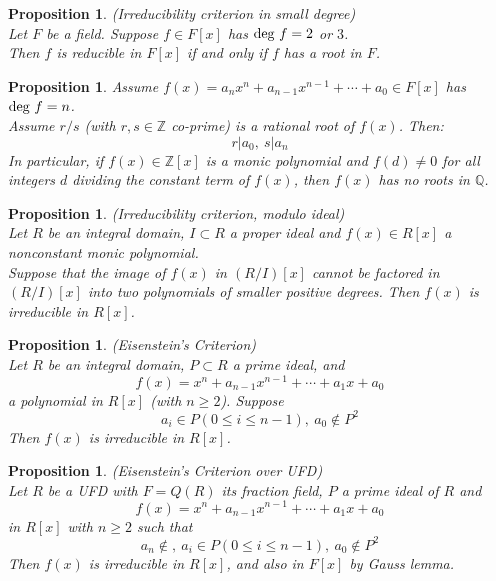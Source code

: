 \documentclass[a4paper,8pt]{article}
\newcommand{\Q}{\mathbb{Q}}
\newcommand{\Z}{\mathbb{Z}}
\newcommand{\hlt}[1]{\textit{{\color{blue}#1}}}
\newcommand{\degs}[1]{\textnormal{deg}#1}
\theoremstyle{theorem}
\newtheorem{proposition}[theorem]{Proposition}
\begin{document}
\begin{proposition}
\hlt{(Irreducibility criterion in small degree)}\\
Let $F$ be a field. Suppose $f \in F[x]$	 has $\degs \ f = 2$ or $3$. \\
Then $f$ is reducible in $F[x]$ if and only if $f$ has a root in $F$.
\end{proposition}

\begin{proposition}
Assume $f(x) = a_n x^n + a_{n-1} x^{n-1} + \cdots + a_0 \in F[x]$ has $\degs \ f = n$.\\
Assume $r/s$ (with $r, s \in \Z$ co-prime) is a rational root of $f(x)$. Then:
\begin{equation}
r|a_0,\ s|a_n \nonumber
\end{equation}	
In particular, if $f(x) \in \Z[x]$ is a monic polynomial and $f(d) \neq 0$ for all integers $d$ dividing the constant term of $f(x)$, then $f(x)$ has no roots in $\Q$.
\end{proposition}

\begin{proposition}
\hlt{(Irreducibility criterion, modulo ideal)}\\
Let $R$ be an integral domain, $I \subset R$ a proper ideal and $f(x) \in R[x]$ a nonconstant monic polynomial.\\
Suppose that the image of $f(x)$ in $(R/I)[x]$ cannot be factored in $(R/I)[x]$ into two polynomials of smaller positive degrees. Then $f(x)$ is irreducible in $R[x]$.
\end{proposition}

\begin{proposition}
\hlt{(Eisenstein's Criterion)}\\
Let $R$ be an integral domain, $P \subset R$ a prime ideal, and
\begin{equation}
f(x) = x^n + a_{n-1} x^{n-1} + \cdots + a_1 x + a_0 \nonumber
\end{equation}
a polynomial in $R[x]$ (with $n \geq 2$). Suppose
\begin{equation}
a_i \in P(0\leq i \leq n-1),\ a_0 \notin P^2 \nonumber
\end{equation}
Then $f(x)$ is irreducible in $R[x]$.
\end{proposition}

\begin{proposition}
\hlt{(Eisenstein's Criterion over UFD)}\\
Let $R$ be a UFD with $F=Q(R)$ its fraction field, $P$ a prime ideal of $R$ and
\begin{equation}
f(x) = x^n + a_{n-1} x^{n-1} + \cdots + a_1 x + a_0 \nonumber
\end{equation}
in $R[x]$ with $n \geq 2$ such that 
\begin{equation}
a_n \notin,\ a_i \in P(0\leq i \leq n-1),\ a_0 \notin P^2 \nonumber
\end{equation}
Then $f(x)$ is irreducible in $R[x]$, and also in $F[x]$ by Gauss lemma.
\end{proposition}
\end{document}
